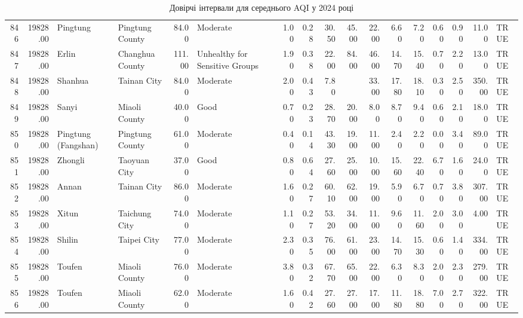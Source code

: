 \begin{table}[ht]
\begin{tabular}{rrllrlrrrrrrrrrrl}
  846 & 19828.00 & Pingtung & Pingtung County & 84.00 & Moderate & 1.00 & 0.28 & 30.50 & 45.00 & 22.00 & 6.60 & 7.20 & 0.60 & 0.90 & 11.00 & TRUE \\ 
  847 & 19828.00 & Erlin & Changhua County & 111.00 & Unhealthy for Sensitive Groups & 1.90 & 0.38 & 22.00 & 84.00 & 46.00 & 14.70 & 15.40 & 0.70 & 2.20 & 13.00 & TRUE \\ 
  848 & 19828.00 & Shanhua & Tainan City & 84.00 & Moderate & 2.00 & 0.43 & 7.80 &  & 33.00 & 17.80 & 18.10 & 0.30 & 2.50 & 350.00 & TRUE \\ 
  849 & 19828.00 & Sanyi & Miaoli County & 40.00 & Good & 0.70 & 0.23 & 28.70 & 20.00 & 8.00 & 8.70 & 9.40 & 0.60 & 2.10 & 18.00 & TRUE \\ 
  850 & 19828.00 & Pingtung (Fangshan) & Pingtung County & 61.00 & Moderate & 0.40 & 0.14 & 43.30 & 19.00 & 11.00 & 2.40 & 2.20 & 0.00 & 3.40 & 89.00 & TRUE \\ 
  851 & 19828.00 & Zhongli & Taoyuan City & 37.00 & Good & 0.80 & 0.64 & 27.60 & 25.00 & 10.00 & 15.60 & 22.40 & 6.70 & 1.60 & 24.00 & TRUE \\ 
  852 & 19828.00 & Annan & Tainan City & 86.00 & Moderate & 1.60 & 0.27 & 60.10 & 62.00 & 19.00 & 5.90 & 6.70 & 0.70 & 3.80 & 307.00 & TRUE \\ 
  853 & 19828.00 & Xitun & Taichung City & 74.00 & Moderate & 1.10 & 0.27 & 53.20 & 34.00 & 11.00 & 9.60 & 11.60 & 2.00 & 3.00 & 4.00 & TRUE \\ 
  854 & 19828.00 & Shilin & Taipei City & 77.00 & Moderate & 2.30 & 0.35 & 76.00 & 61.00 & 23.00 & 14.70 & 15.30 & 0.60 & 1.40 & 334.00 & TRUE \\ 
  855 & 19828.00 & Toufen & Miaoli County & 76.00 & Moderate & 3.80 & 0.32 & 67.70 & 65.00 & 22.00 & 6.30 & 8.30 & 2.00 & 2.30 & 279.00 & TRUE \\ 
  856 & 19828.00 & Toufen & Miaoli County & 62.00 & Moderate & 1.60 & 0.42 & 27.60 & 27.00 & 17.00 & 11.80 & 18.80 & 7.00 & 2.70 & 322.00 & TRUE \\ 
   \hline
\end{tabular}
\caption{Довірчі інтервали для середнього AQI у 2024 році} 
\label{tab:aqi_2024}
\end{table}
